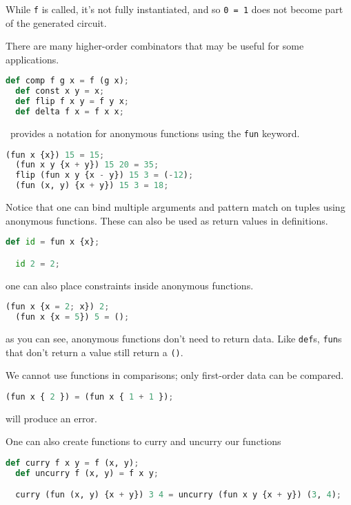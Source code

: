 While \lstinline{f} is called, it's not fully instantiated, and so \lstinline{0 = 1} does not become part of the generated circuit.

There are many higher-order combinators that may be useful for some applications.

\begin{lstlisting}[language=Python]
  def comp f g x = f (g x);
  def const x y = x;
  def flip f x y = f y x;
  def delta f x = f x x;
\end{lstlisting}

\vampir\ provides a notation for anonymous functions using the \lstinline{fun} keyword.

\begin{lstlisting}[language=Python]
  (fun x {x}) 15 = 15;
  (fun x y {x + y}) 15 20 = 35;
  flip (fun x y {x - y}) 15 3 = (-12);
  (fun (x, y) {x + y}) 15 3 = 18;
\end{lstlisting}

Notice that one can bind multiple arguments and pattern match on tuples using anonymous functions. These can also be used as return values in definitions.

\begin{lstlisting}[language=Python]
  def id = fun x {x};

  id 2 = 2;
\end{lstlisting}

one can also place constraints inside anonymous functions.

\begin{lstlisting}[language=Python]
  (fun x {x = 2; x}) 2;
  (fun x {x = 5}) 5 = ();
\end{lstlisting}

as you can see, anonymous functions don't need to return data. Like \lstinline{def}s, \lstinline{fun}s that don't return a value still return a \lstinline{()}.

We cannot use functions in comparisons; only first-order data can be compared. 

\begin{lstlisting}[language=Python]
  (fun x { 2 }) = (fun x { 1 + 1 });
\end{lstlisting}

will produce an error.

One can also create functions to curry and uncurry our functions

\begin{lstlisting}[language=Python]
  def curry f x y = f (x, y);
  def uncurry f (x, y) = f x y;

  curry (fun (x, y) {x + y}) 3 4 = uncurry (fun x y {x + y}) (3, 4);
\end{lstlisting}

